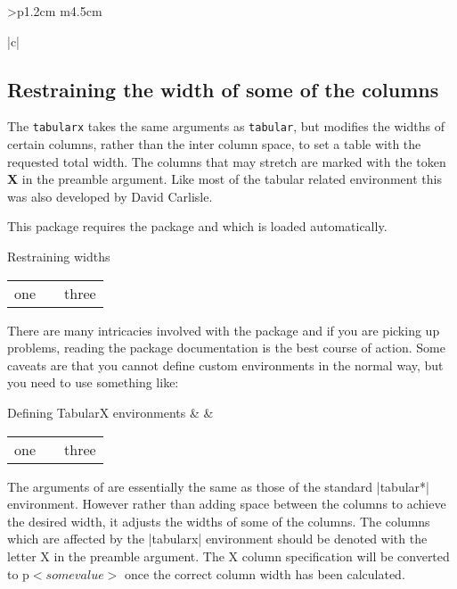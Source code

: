 \begin{tabular}{>{\bfseries}p{1.2cm} m{4.5cm}}
\begin{tabular}[t]{|c|}
\subsection{Restraining the width of some of the columns}

The \texttt{tabularx} takes the same arguments
as \texttt{tabular}, but modifies the widths of certain columns, rather than
the inter column space, to set a table with the requested total width. The
columns that may stretch are marked with the token \textbf{X} in the preamble argument. Like most of the tabular related environment this was also developed by David Carlisle.



This package requires the  package and which is loaded automatically.

\begin{texexample}{Restraining widths}{}
\begin{tabularx}{\linewidth}{|c|X|c|}
   one & \lipsum[1] &three \\
\end{tabularx}
\end{texexample}

There are many intricacies involved with the package and if you are picking up problems, reading the package documentation is the best course of action. Some caveats are that you cannot define custom environments in the normal way, but you need to use something like:

\begin{teXXX}
\newenvironment{foo}{\tabularx{XX}}{\endtabularx}
\end{teXXX}

\begin{texexample}{Defining TabularX environments}{}
\newenvironment{XXX}{
}{
\endtabularx}
\begin{XXX}
\lorem & \lorem &\lorem\\
\end{XXX}
\end{texexample}


{\scriptsize

\begin{tabular}{|c|p{3.0cm}|c|}
one & \lipsum[1] &three\\
\end{tabular}

}



The arguments of  are essentially the same as those of the standard
|tabular*| environment. However rather than adding space between the columns
to achieve the desired width, it adjusts the widths of some of the columns. The
columns which are affected by the |tabularx| environment should be denoted with
the letter X in the preamble argument. The X column specification will be converted
to p{$<some value>$} once the correct column width has been calculated.


\end{tabular}
\end{tabular}
